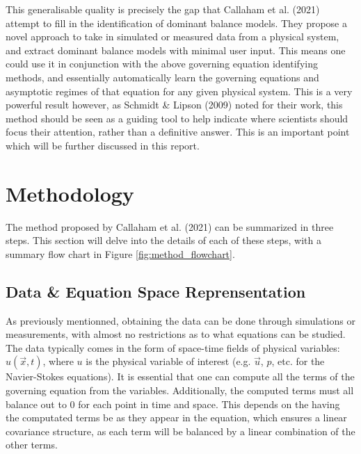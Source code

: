 \documentclass[12pt]{report} %
\begin{document}
\vspace{5mm}

This generalisable quality is precisely the gap that Callaham et al. (2021)\cite{callaham2021learning} attempt to fill in the identification of dominant balance models. They propose a novel approach to take in simulated or measured data from a physical system, and extract dominant balance models with minimal user input. This means one could use it in conjunction with the above governing equation identifying methods, and essentially automatically learn the governing equations and asymptotic regimes of that equation for any given physical system. This is a very powerful result however, as Schmidt \& Lipson (2009) noted for their work, this method should be seen as a guiding tool to help indicate where scientists should focus their attention, rather than a definitive answer. This is an important point which will be further discussed in this report.


\chapter{Methodology}

The method proposed by Callaham et al. (2021)\cite{callaham2021learning} can be summarized in three steps. This section will delve into the details of each of these steps, with a summary flow chart in Figure \ref{fig:method_flowchart}.

\section{Data \& Equation Space Reprensentation}

As previously mentionned, obtaining the data can be done through simulations or measurements, with almost no restrictions as to what equations can be studied. The data typically comes in the form of space-time fields of physical variables: $u(\vec{x}, t)$, where $u$ is the physical variable of interest (e.g. $\vec{u}$, $p$, etc. for the Navier-Stokes equations). It is essential that one can compute all the terms of the governing equation from the variables. Additionally, the computed terms must all balance out to 0 for each point in time and space. This depends on the having the computated terms be as they appear in the equation, which ensures a linear covariance structure, as each term will be balanced by a linear combination of the other terms\cite[Supplementary Information]{callaham2021learning}.

\vspace{5mm}
\end{document}
